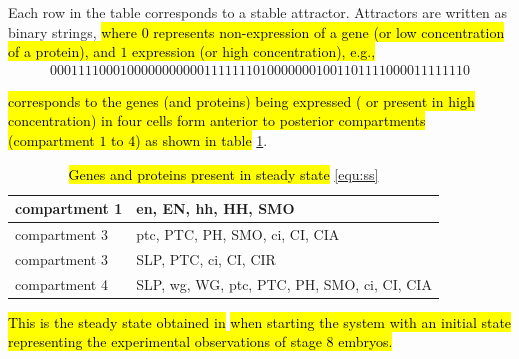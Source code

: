 \documentclass[10pt]{bmc_article}
\newenvironment{bmcformat}{\begin{raggedright}\baselineskip20pt\sloppy\setboolean{publ}{false}}{\end{raggedright}\baselineskip20pt\sloppy}
\newcommand{\comment}[1]{}
\begin{document}
\begin{bmcformat}
Each row in the table corresponds to a stable attractor. Attractors are written as binary strings, \hl{where $0$ represents non-expression of a gene (or low concentration of a protein), and $1$ expression (or high concentration), e.g.,} 
\begin{align}\label{equ:ss}
	0 0 0 1 1 1 1 0 0 0 1 0 0 0 0
	0 0 0 0 0 0 0 1 1 1 1 1 1 1 0
	1 0 0 0 0 0 0 0 1 0 0 1 1 0 1
	1 1 1 0 0 0 0 1 1 1 1 1 1 1 0
\end{align}

\hl{corresponds to the genes (and proteins) being expressed ( or present in high concentration) in four cells form anterior to posterior compartments (compartment $1$ to $4$) as shown in table} \ref{table:ss}.
\begin{table}
	\begin{tabular}{|l|l|}
		\hline
		compartment 1 & en,	EN,	hh,	HH,	SMO\\
		\hline
		compartment 3 &ptc, PTC, PH, SMO, ci, CI, CIA\\
		\hline
		compartment 3 &SLP, PTC, ci, CI, CIR\\
		\hline
		compartment 4 &SLP, wg, WG, ptc, PTC, PH, SMO, ci, CI, CIA\\
		\hline
	\end{tabular}\caption{\hl{Genes and proteins present in steady state} \ref{equ:ss}}
	\label{table:ss}
\end{table}
\hl{This is the steady state obtained in} \cite{AO} \hl{when starting the system with an initial state representing the experimental observations of stage 8 embryos.} \comment{Note that we include variables for SLP, which are not shown in %
as they are fixed to be OFF in the anterior part, and ON in the posterior part throughout the paper, i.e., $0011$.} 



\end{bmcformat}
\end{document}
